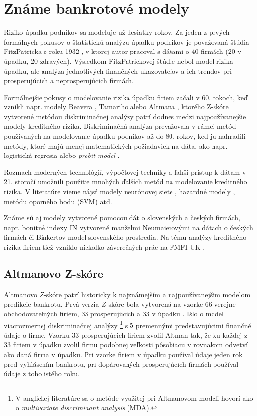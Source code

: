 \section{Známe bankrotové modely}

Riziko úpadku podnikov sa modeluje už desiatky rokov.
Za jeden z prvých formálnych pokusov o štatistickú analýzu úpadku podnikov je považovaná štúdia FitzPatricka z roku 1932 \cite{fitzpatrick},
v ktorej autor pracoval s dátami o 40 firmách (20 v úpadku, 20 zdravých).
Výsledkom FitzPatrickovej štúdie nebol model rizika úpadku, ale analýza jednotlivých finančných ukazovateľov a ich trendov pri prosperujúcich a neprosperujúcich firmách.

Formálnejšie pokusy o modelovanie rizika úpadku firiem začali v 60. rokoch, keď vznikli napr. modely Beavera \cite{beaver}, Tamariho \cite{tamari} alebo Altmana \cite{altman1968},
ktorého Z-skóre vytvorené metódou diskriminačnej analýzy patrí dodnes medzi najpoužívanejšie modely kreditného rizika.
Diskriminačná analýza prevažovala v rámci metód používaných na modelovanie úpadku podnikov až do 80. rokov, keď ju nahradili metódy,
ktoré majú menej matematických požiadaviek na dáta, ako napr. logistická regresia alebo \emph{probit model} \cite{gruszczynski}.

Rozmach moderných technológií, výpočtovej techniky a ľahší prístup k dátam v 21. storočí umožnili použitie mnohých ďalších metód na modelovanie kreditného rizika.
V literatúre vieme nájsť modely neurónovej siete \cite{tsai}, hazardné modely \cite{shumway}, metódu oporného bodu (SVM) \cite{min} atď.

Známe sú aj modely vytvorené pomocou dát o slovenských a českých firmách, napr. bonitné indexy IN vytvorené manželmi Neumaierovými na dátach o českých firmách
či Binkertov model \cite{zalai} slovenského prostredia.
Na tému analýzy kreditného rizika firiem tiež vzniklo niekoľko záverečných prác na FMFI UK \cite{ondrusekova, bohdal}.

\subsection{Altmanovo Z-skóre}

Altmanovo \(Z\)-skóre patrí historicky k najznámejším a najpoužívanejším modelom predikcie bankrotu.
Prvá verzia \(Z\)-skóre bola vytvorená na vzorke \(66\) verejne obchodovateľných firiem, \(33\) prosperujúcich a \(33\) v úpadku \cite{altman1968}.
Išlo o model viacrozmernej diskriminačnej analýzy
\footnote{V anglickej literatúre sa o metóde využitej pri Altmanovom modeli hovorí ako o \emph{multivariate discriminant analysis} (MDA).}
s \(5\) premennými predstavujúcimi finančné údaje o firme.
Vzorku 33 prosperujúcich firiem zvolil Altman tak, že ku každej z \(33\) firiem v úpadku zvolil firmu podobnej veľkosti pôsobiacu v rovnakom odvetví ako daná firma v úpadku.
Pri vzorke firiem v úpadku používal údaje jeden rok pred vyhlásením bankrotu, pri dopárovaných prosperujúcich firmách používal údaje z toho istého roku.

